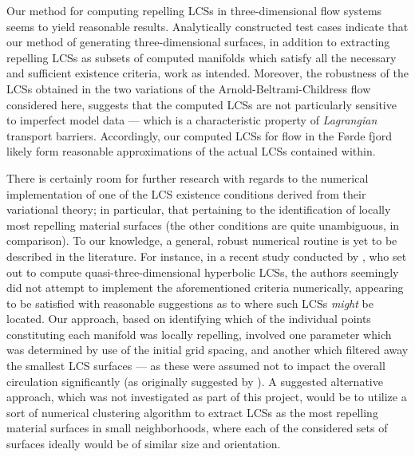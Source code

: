 Our method for computing repelling LCSs in three-dimensional flow systems
seems to yield reasonable results. Analytically constructed test cases indicate
that our method of generating three-dimensional surfaces, in addition to
extracting repelling LCSs as subsets of computed manifolds which satisfy all
the necessary and sufficient existence criteria, work as intended. Moreover,
the robustness of the LCSs obtained in the two variations of the
Arnold-Beltrami-Childress flow considered here, suggests that the computed LCSs
are not particularly sensitive to imperfect model data --- which is a
characteristic property of \emph{Lagrangian} transport barriers. Accordingly,
our computed LCSs for flow in the Førde fjord likely form reasonable
approximations of the actual LCSs contained within.

There is certainly room for further research with regards to the numerical
implementation of one of the LCS existence conditions derived from their
variational theory; in particular, that pertaining to the identification of
locally most repelling material surfaces (the other conditions are quite
unambiguous, in comparison). To our knowledge, a general, robust numerical
routine is yet to be described in the literature. For instance, in a recent
study conducted by \textcite{oettinger2016autonomous}, who set out to compute
quasi-three-dimensional hyperbolic LCSs, the authors seemingly did not attempt
to implement the aforementioned criteria numerically, appearing to be satisfied
with reasonable suggestions as to where such LCSs \emph{might} be located. Our
approach, based on identifying which of the individual points constituting each
manifold was locally repelling, involved one parameter which was determined by
use of the  initial grid spacing, and another which filtered away the smallest
LCS  surfaces --- as these were assumed not to impact the overall circulation
significantly (as originally suggested by \textcite{farazmand2012computing}).
A suggested alternative approach, which was not investigated as part of this
project, would be to utilize a sort of numerical clustering algorithm to
extract LCSs as the most repelling material surfaces in small neighborhoods,
where each of the considered sets of surfaces ideally would be of similar size
and orientation.

